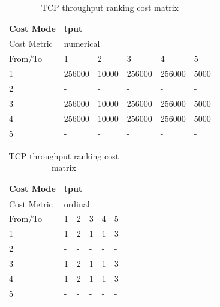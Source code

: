 \begin{table}
\begin{subtable}{.65\linewidth}
        \begin{tabular}{|l|l|l|l|l|l|}
        \hline
        Cost Mode   & \multicolumn{5}{|l|}{tput}                       \\ \hline
        Cost Metric & \multicolumn{5}{|l|}{numerical}                  \\ \hline
        From/To     & 1         & 2     & 3        & 4        & 5      \\ \hline
        1           & 256000    & 10000 & 256000   & 256000   & 5000   \\ \hline
        2           & -         & -     & -        & -        & -      \\ \hline
        3           & 256000    & 10000 & 256000   & 256000   & 5000   \\ \hline
        4           & 256000    & 10000 & 256000   & 256000   & 5000   \\ \hline
        5           & -         & -     & -        & -        & -      \\ \hline
        \end{tabular}
    \caption{TCP throughput cost matrix}
    \end{subtable}
    \begin{subtable}{.30\linewidth}
        \centering
        \begin{tabular}{|l|l|l|l|l|l|}
        \hline
        Cost Mode   & \multicolumn{5}{|l|}{tput}                       \\ \hline
        Cost Metric & \multicolumn{5}{|l|}{ordinal}                    \\ \hline
        From/To     & 1         & 2     & 3        & 4        & 5      \\ \hline
        1           & 1         & 2     & 1        & 1        & 3      \\ \hline
        2           & -         & -     & -        & -        & -      \\ \hline
        3           & 1         & 2     & 1        & 1        & 3      \\ \hline
        4           & 1         & 2     & 1        & 1        & 3      \\ \hline
        5           & -         & -     & -        & -        & -      \\ \hline
        \end{tabular}
    \caption{TCP throughput ranking cost matrix}
    \end{subtable}
    \begin{subtable}{1\linewidth}

\end{subtable}
\end{table}
